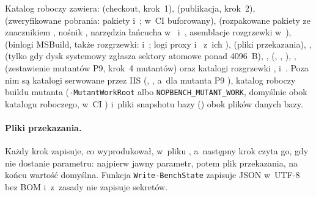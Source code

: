 Katalog roboczy zawiera:  (checkout, krok~1), 
(publikacja, krok~2),  (zweryfikowane pobrania: pakiety
 i~; w~CI buforowany),
 (rozpakowane pakiety ze znacznikiem , nośnik
, narzędzia łańcucha w~
i~, asemblacje rozgrzewki w~),
 (binlogi MSBuild, także rozgrzewki: 
i~; logi proxy 
i~ z~ich ),  (pliki przekazania),
,  (tylko gdy dysk systemowy zgłasza sektory
atomowe ponad 4096~B), ,  (,
, ), , 
(zestawienie mutantów P9, krok~4 mutantów) oraz katalogi rozgrzewki ,
 i~. Poza nim są katalogi serwowane przez IIS
(, , a~dla mutanta P9
), katalog roboczy buildu mutanta (\texttt{-MutantWorkRoot}
albo \texttt{NOPBENCH\_MUTANT\_WORK}, domyślnie  obok katalogu roboczego, w~CI
) i~pliki snapshotu bazy () obok
plików danych bazy.

\paragraph{Pliki przekazania.} Każdy krok zapisuje, co wyprodukował, w~pliku
, a~następny krok czyta go, gdy nie dostanie parametru:
najpierw jawny parametr, potem plik przekazania, na końcu wartość domyślna. Funkcja
\texttt{Write-BenchState} zapisuje JSON w~UTF-8 bez BOM i~z~zasady nie zapisuje sekretów.


